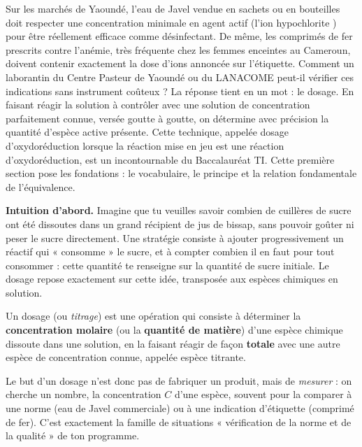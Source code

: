\documentclass[11pt]{article}
\newcommand{\cle}[1]{{\popxbold\color{popdark}#1}}
\newcounter{popsec}
\newcounter{popsub}
\newcommand{\courssub}[1]{%
  \stepcounter{popsub}%
  \par\vspace{9pt}\noindent{\popxbold\fontsize{11.5}{13}\selectfont\color{popink}{\color{poporange}\thepopsec.\thepopsub}\hspace{6pt}#1}\par\nopagebreak\vspace{4pt}
}
\begin{document}
Sur les marchés de Yaoundé, l'eau de Javel vendue en sachets ou en bouteilles doit respecter une concentration minimale en agent actif (l'ion hypochlorite ) pour être réellement efficace comme désinfectant. De même, les comprimés de fer prescrits contre l'anémie, très fréquente chez les femmes enceintes au Cameroun, doivent contenir exactement la dose d'ions  annoncée sur l'étiquette. Comment un laborantin du Centre Pasteur de Yaoundé ou du LANACOME peut-il vérifier ces indications sans instrument coûteux ? La réponse tient en un mot : le \cle{dosage}. En faisant réagir la solution à contrôler avec une solution de concentration parfaitement connue, versée goutte à goutte, on détermine avec précision la quantité d'espèce active présente. Cette technique, appelée \cle{dosage d'oxydoréduction} lorsque la réaction mise en jeu est une réaction d'oxydoréduction, est un incontournable du Baccalauréat TI. Cette première section pose les fondations : le vocabulaire, le principe et la relation fondamentale de l'équivalence.

\courssub{Qu'est-ce qu'un dosage ?}

\textbf{Intuition d'abord.} Imagine que tu veuilles savoir combien de cuillères de sucre ont été dissoutes dans un grand récipient de jus de bissap, sans pouvoir goûter ni peser le sucre directement. Une stratégie consiste à ajouter progressivement un réactif qui « consomme » le sucre, et à compter combien il en faut pour tout consommer : cette quantité te renseigne sur la quantité de sucre initiale. Le dosage repose exactement sur cette idée, transposée aux espèces chimiques en solution.

\begin{definition}[Dosage]
Un \cle{dosage} (ou \emph{titrage}) est une opération qui consiste à déterminer la \textbf{concentration molaire} (ou la \textbf{quantité de matière}) d'une espèce chimique dissoute dans une solution, en la faisant réagir de façon \textbf{totale} avec une autre espèce de concentration connue, appelée espèce titrante.
\end{definition}

Le but d'un dosage n'est donc pas de fabriquer un produit, mais de \emph{mesurer} : on cherche un nombre, la concentration $C$ d'une espèce, souvent pour la comparer à une norme (eau de Javel commerciale) ou à une indication d'étiquette (comprimé de fer). C'est exactement la famille de situations « vérification de la norme et de la qualité » de ton programme.
\end{document}
